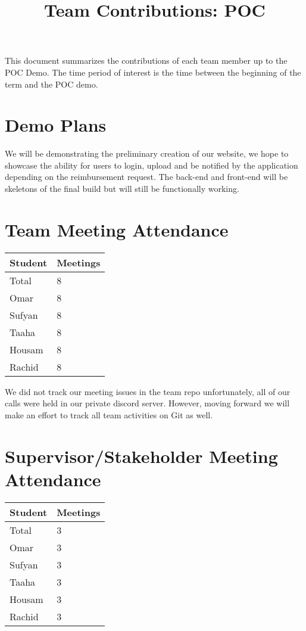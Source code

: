 \documentclass{article}
\title{Team Contributions: POC\\\progname}
\author{\authname}
\date{}
\begin{document}
\maketitle

This document summarizes the contributions of each team member up to the POC
Demo.  The time period of interest is the time between the beginning of the term
and the POC demo.

\section{Demo Plans}

We will be demonstrating the preliminary creation of our website, we hope to showcase the ability for users to login, upload and be notified by the application depending on the reimbursement request. The back-end and front-end will be skeletons of the final build but will still be functionally working. 

\section{Team Meeting Attendance}

\begin{table}[H]
\centering
\begin{tabular}{ll}
\toprule
\textbf{Student} & \textbf{Meetings}\\
\midrule
Total & 8\\
Omar & 8\\
Sufyan & 8\\
Taaha & 8\\
Housam & 8\\
Rachid & 8\\
\bottomrule
\end{tabular}
\end{table}

We did not track our meeting issues in the team repo unfortunately, all of our calls were held in our private discord server. However, moving forward we will make an effort to track all team activities on Git as well. 

\section{Supervisor/Stakeholder Meeting Attendance}

\begin{table}[H]
\centering
\begin{tabular}{ll}
\toprule
\textbf{Student} & \textbf{Meetings}\\
\midrule
Total & 3\\
Omar & 3\\
Sufyan & 3\\
Taaha & 3\\
Housam & 3\\
Rachid & 3\\
\end{tabular}
\end{table}
\end{document}
